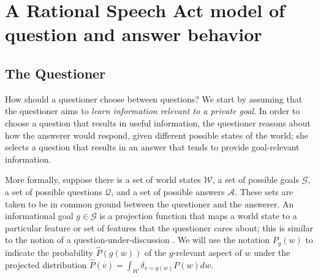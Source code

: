 \documentclass[12pt, floatsintext, jou]{apa6}
\begin{document}
\section{A Rational Speech Act model of question and answer behavior}
\label{sec:model}

\subsection{The Questioner}

How should a questioner choose between questions?
%
We start by assuming that the questioner aims to \emph{learn information relevant to a private goal}.
%
In order to choose a question that results in useful information, the questioner reasons about how the answerer would respond, given different possible states of the world; she selects a question that results in an answer that tends to provide goal-relevant information.
%



More formally, suppose there is a set of world states $\mathcal{W}$, a set of possible goals $\mathcal{G}$, a set of possible questions $\mathcal{Q}$, and a set of possible answers $\mathcal{A}$.
These sets are taken to be in common ground between the questioner and the answerer.
An informational goal $g \in \mathcal{G}$ is a projection function that maps a world state to a particular feature or set of features that the questioner cares about; this is similar to the notion of a question-under-discussion \cite{Roberts96_InformationStructureDiscourse}.
We will use the notation $P_{g}(w)$ to indicate the probability $\hat{P}(g(w))$ of the $g$-relevant aspect of $w$ under the projected distribution 
$\hat{P}(v) = \int_{\mathcal{W}} \delta_{v=g(w)}P(w)dw$.
\end{document}

